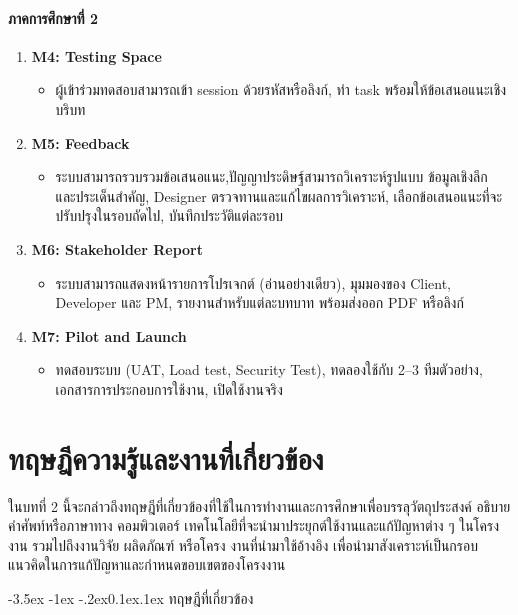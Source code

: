 \documentclass[a4paper,oneside]{cpe-thesis-th}
\makeatletter
\renewcommand\section{\@startsection{section}{1}{\z@}%
   {-3.5ex \@plus -1ex \@minus -.2ex}{0.1ex\@plus.1ex}%
   {\normalfont\thsz@section\bfseries}}
\newcommand{\thaijustify}[1]{%
  \par\hspace{30pt}\justifying
  #1
}
\makeatother
\begin{document}
\subsubsection{ภาคการศึกษาที่ 2}
\begin{enumerate}
  \item \textbf{M4: Testing Space}
  \begin{itemize}
    \item ผู้เข้าร่วมทดสอบสามารถเข้า session ด้วยรหัสหรือลิงก์, ทำ task พร้อมให้ข้อเสนอแนะเชิงบริบท
  \end{itemize}
  \item \textbf{M5: Feedback}
  \begin{itemize}
    \item ระบบสามารถรวบรวมข้อเสนอแนะ,ปัญญาประดิษฐ์สามารถวิเคราะห์รูปแบบ ข้อมูลเชิงลึก และประเด็นสำคัญ, Designer ตรวจทานและแก้ไขผลการวิเคราะห์, เลือกข้อเสนอแนะที่จะปรับปรุงในรอบถัดไป, บันทึกประวัติแต่ละรอบ
  \end{itemize}
  \item \textbf{M6: Stakeholder Report}
  \begin{itemize}
    \item ระบบสามารถแสดงหน้ารายการโปรเจกต์ (อ่านอย่างเดียว), มุมมองของ Client, Developer และ PM, รายงานสำหรับแต่ละบทบาท พร้อมส่งออก PDF หรือลิงก์
  \end{itemize}
  \item \textbf{M7: Pilot and Launch}
  \begin{itemize}
    \item ทดสอบระบบ (UAT, Load test, Security Test), ทดลองใช้กับ 2–3 ทีมตัวอย่าง, เอกสารการประกอบการใช้งาน, เปิดใช้งานจริง
  \end{itemize}
\end{enumerate}


\chapter{ทฤษฎีความรู้และงานที่เกี่ยวข้อง}
\thaijustify{
  ในบทที่ 2 นี้จะกล่าวถึงทฤษฎีที่เกี่ยวข้องที่ใช้ในการทำงานและการศึกษาเพื่อบรรลุวัตถุประสงค์ อธิบายคำศัพท์หรือภาษาทาง
คอมพิวเตอร์ เทคโนโลยีที่จะนำมาประยุกต์ใช้งานและแก้ปัญหาต่าง ๆ ในโครงงาน รวมไปถึงงานวิจัย ผลิดภัณฑ์ หรือโครง
งานที่นำมาใช้อ้างอิง เพื่อนำมาสังเคราะห์เป็นกรอบแนวคิดในการแก้ปัญหาและกำหนดขอบเขตของโครงงาน
}

\section{ทฤษฎีที่เกี่ยวข้อง}
\end{document}

